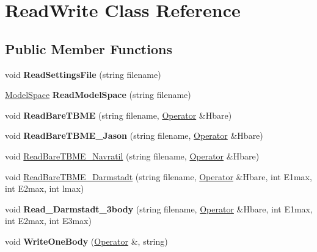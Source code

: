 \hypertarget{classReadWrite}{\section{Read\-Write Class Reference}
\label{classReadWrite}
}
\subsection*{Public Member Functions}
\begin{DoxyCompactItemize}
\item 
\hypertarget{classReadWrite_a7074f8c5e6b1bbeb90a4c534b913ac53}{void {\bfseries Read\-Settings\-File} (string filename)}\label{classReadWrite_a7074f8c5e6b1bbeb90a4c534b913ac53}

\item 
\hypertarget{classReadWrite_adbf1ad5fe47c97c87994cfc28df5c740}{\hyperlink{classModelSpace}{Model\-Space} {\bfseries Read\-Model\-Space} (string filename)}\label{classReadWrite_adbf1ad5fe47c97c87994cfc28df5c740}

\item 
\hypertarget{classReadWrite_a7ebe7ea4d8a322b23b144658da562277}{void {\bfseries Read\-Bare\-T\-B\-M\-E} (string filename, \hyperlink{classOperator}{Operator} \&Hbare)}\label{classReadWrite_a7ebe7ea4d8a322b23b144658da562277}

\item 
\hypertarget{classReadWrite_ae5271000cceab5fcebab7e9d2faf9f1f}{void {\bfseries Read\-Bare\-T\-B\-M\-E\-\_\-\-Jason} (string filename, \hyperlink{classOperator}{Operator} \&Hbare)}\label{classReadWrite_ae5271000cceab5fcebab7e9d2faf9f1f}

\item 
void \hyperlink{classReadWrite_ab66f5d7e2e352e973597915c08cad45d}{Read\-Bare\-T\-B\-M\-E\-\_\-\-Navratil} (string filename, \hyperlink{classOperator}{Operator} \&Hbare)
\item 
void \hyperlink{classReadWrite_a7d1ea6782d893eab0217bb965fba990e}{Read\-Bare\-T\-B\-M\-E\-\_\-\-Darmstadt} (string filename, \hyperlink{classOperator}{Operator} \&Hbare, int E1max, int E2max, int lmax)
\item 
\hypertarget{classReadWrite_a84c0cbaf2be415eadffb560ea0bb9785}{void {\bfseries Read\-\_\-\-Darmstadt\-\_\-3body} (string filename, \hyperlink{classOperator}{Operator} \&Hbare, int E1max, int E2max, int E3max)}\label{classReadWrite_a84c0cbaf2be415eadffb560ea0bb9785}

\item 
\hypertarget{classReadWrite_a257e2a926e252a2952b330b3655ddd3d}{void {\bfseries Write\-One\-Body} (\hyperlink{classOperator}{Operator} \&, string)}\label{classReadWrite_a257e2a926e252a2952b330b3655ddd3d}


\end{DoxyCompactItemize}
